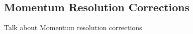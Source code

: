 \subsection{Momentum Resolution Corrections}
\label{MomentumResolutionCorrections}

Talk about Momentum resolution corrections